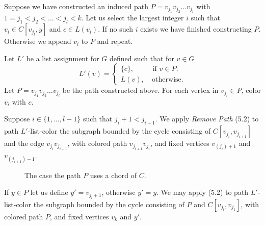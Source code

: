 \documentclass[letterpaper, 12pt]{article}
\theoremstyle{thm}
\begin{document}
Suppose we have constructed an induced path $P=v_{j_1}v_{j_2}\ldots v_{j_l}$
with $1=j_1<j_2<\ldots<j_l< k$. Let us select the largest integer $i$ such
that $v_i\in C[v_{j_l},y]$ and $c\in L(v_i)$. If no such $i$ exists we have
finished constructing $P$. Otherwise we append $v_i$ to $P$ and repeat.

Let $L'$ be a list assignment for $G$ defined such that for $v\in G$
\[
	L'(v) = \begin{cases}
				\{c\}, & \text{ if } v\in P;\\
				L(v), & \ \text{otherwise}.
			\end{cases}
\]
Let $P=v_{j_1}v_{j_2}\ldots v_{j_l}$ be the path constructed above.
For each vertex in $v_{j_i}\in P$, color $v_i$ with $c$.

Suppose
$i\in\{1,\ldots,l-1\}$ such that $j_i+1<j_{i+1}$. We apply \textit{Remove Path}
(5.2) to path $L'$-list-color the subgraph bounded by the cycle consisting of
$C[v_{j_i},v_{j_{i+1}}]$ and the edge $v_{j_i}v_{j_{i+1}}$, with colored path
$v_{j_{i+1}}v_{j_i}$, and fixed vertices $v_{(j_i)+1}$ and $v_{(j_{i+1})-1}$.

\begin{figure}
\begin{center}

\caption{The case the path $P$ uses a chord of $C$.}
\end{center}
\end{figure}

If $y\in P$ let us define $y'=v_{j_l+1}$, otherwise $y'=y$.
We may apply  (5.2) to path $L'$-list-color the
subgraph bounded by the cycle consisting of $P$ and $C[v_{j_l},v_{j_1}]$, with
colored path $P$, and fixed vertices $v_k$ and $y'$.
\end{document}
